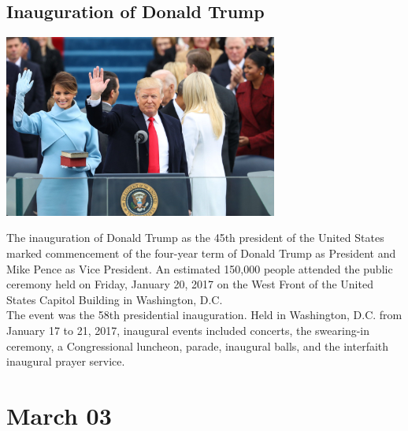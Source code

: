 \documentclass[11pt]{report}
\begin{document}
\subsection{Inauguration of Donald Trump}
\vspace{2mm}\begin{center}\includegraphics[width=9cm]{./img/trumpInaug.jpg}\end{center}
The inauguration of Donald Trump as the 45th president of the United States marked commencement of the four-year term of Donald Trump as President and Mike Pence as Vice President. An estimated 150,000 people attended the public ceremony held on Friday, January 20, 2017 on the West Front of the United States Capitol Building in Washington, D.C.\\
\indent The event was the 58th presidential inauguration. Held in Washington, D.C. from January 17 to 21, 2017, inaugural events included concerts, the swearing-in ceremony, a Congressional luncheon, parade, inaugural balls, and the interfaith inaugural prayer service.
\section{March 03}
\end{document}
